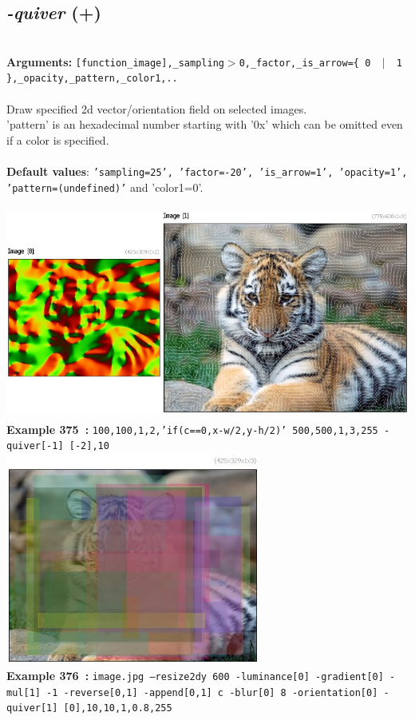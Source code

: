 \documentclass[a4paper,11pt,twoside]{book}
\begin{document}
\subsection{\emph{-quiver} (+)}\vspace*{-0.5em}
~\\\textbf{Arguments: } 
{\small \texttt{[function\_image],\_sampling$>$0,\_factor,\_is\_arrow=\{ 0 ~$|$~ 1 \},\_opacity,\_pattern,\_color1,..}}\\~\\
Draw specified 2d vector/orientation field on selected images.
~\\'pattern' is an hexadecimal number starting with '0x' which can be omitted
even if a color is specified.
~\\~\\\textbf{Default values}: {\small \texttt{'sampling=25', 'factor=-20', 'is\_arrow=1', 'opacity=1', 'pattern=(undefined)'}}
and 'color1=0'.
\begin{center}\includegraphics[keepaspectratio=true,height=7cm,width=\textwidth]{img/gmic_def375.jpg}\\
{\footnotesize \textbf{Example 375~:} \texttt{100,100,1,2,'if(c==0,x-w/2,y-h/2)' 500,500,1,3,255 -quiver[-1] [-2],10}}
\\\includegraphics[keepaspectratio=true,height=7cm,width=\textwidth]{img/gmic_def376.jpg}\\
{\footnotesize \textbf{Example 376~:} \texttt{image.jpg --resize2dy 600 -luminance[0] -gradient[0] -mul[1] -1 -reverse[0,1] -append[0,1] c -blur[0] 8 -orientation[0] -quiver[1] [0],10,10,1,0.8,255}}
\end{center}
\end{document}
